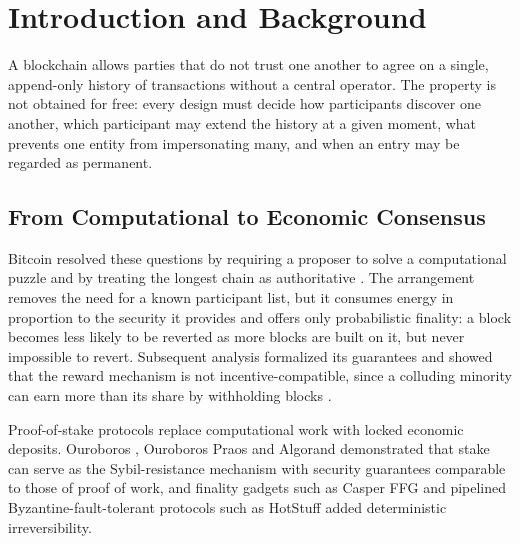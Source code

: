 \documentclass[conference]{IEEEtran}
\begin{document}
\section{Introduction and Background}

A blockchain allows parties that do not trust one another to agree on a single, append-only history of transactions without a central operator. The property is not obtained for free: every design must decide how participants discover one another, which participant may extend the history at a given moment, what prevents one entity from impersonating many, and when an entry may be regarded as permanent.

\subsection{From Computational to Economic Consensus}
Bitcoin resolved these questions by requiring a proposer to solve a computational puzzle and by treating the longest chain as authoritative \cite{nakamoto2008}. The arrangement removes the need for a known participant list, but it consumes energy in proportion to the security it provides and offers only probabilistic finality: a block becomes less likely to be reverted as more blocks are built on it, but never impossible to revert. Subsequent analysis formalized its guarantees \cite{garay2015} and showed that the reward mechanism is not incentive-compatible, since a colluding minority can earn more than its share by withholding blocks \cite{eyal2014}.

Proof-of-stake protocols replace computational work with locked economic deposits. Ouroboros \cite{kiayias2017}, Ouroboros Praos \cite{david2018} and Algorand \cite{gilad2017} demonstrated that stake can serve as the Sybil-resistance mechanism with security guarantees comparable to those of proof of work, and finality gadgets such as Casper FFG \cite{buterin2017} and pipelined Byzantine-fault-tolerant protocols such as HotStuff \cite{yin2019} added deterministic irreversibility.
\end{document}
